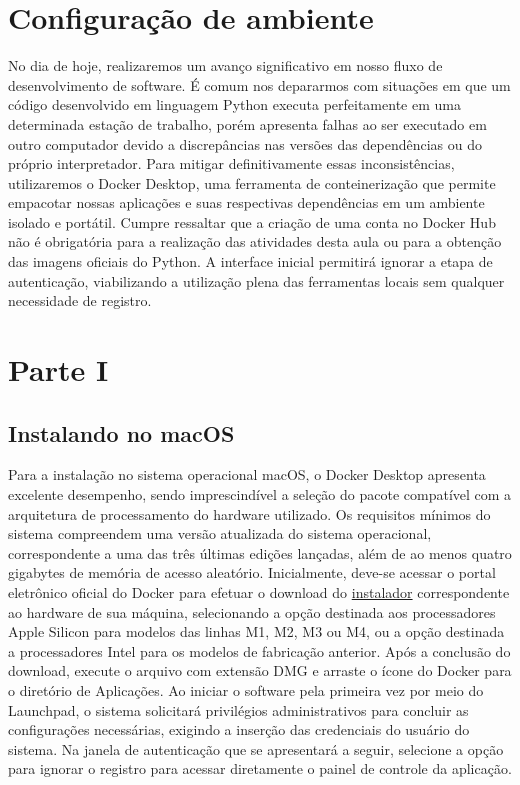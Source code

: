 

\section*{Configuração de ambiente}

No dia de hoje, realizaremos um avanço significativo em nosso fluxo de desenvolvimento de software. É comum nos depararmos com situações em que um código desenvolvido em linguagem Python executa perfeitamente em uma determinada estação de trabalho, porém apresenta falhas ao ser executado em outro computador devido a discrepâncias nas versões das dependências ou do próprio interpretador. Para mitigar definitivamente essas inconsistências, utilizaremos o Docker Desktop, uma ferramenta de conteinerização que permite empacotar nossas aplicações e suas respectivas dependências em um ambiente isolado e portátil.
Cumpre ressaltar que a criação de uma conta no Docker Hub não é obrigatória para a realização das atividades desta aula ou para a obtenção das imagens oficiais do Python. A interface inicial permitirá ignorar a etapa de autenticação, viabilizando a utilização plena das ferramentas locais sem qualquer necessidade de registro.

\section*{Parte I}

\subsection*{Instalando no macOS}

Para a instalação no sistema operacional macOS, o Docker Desktop apresenta excelente desempenho, sendo imprescindível a seleção do pacote compatível com a arquitetura de processamento do hardware utilizado. Os requisitos mínimos do sistema compreendem uma versão atualizada do sistema operacional, correspondente a uma das três últimas edições lançadas, além de ao menos quatro gigabytes de memória de acesso aleatório.
Inicialmente, deve-se acessar o portal eletrônico oficial do Docker para efetuar o download do \href{https://docs.docker.com/desktop/setup/install/mac-install/}{instalador} correspondente ao hardware de sua máquina, selecionando a opção destinada aos processadores Apple Silicon para modelos das linhas M1, M2, M3 ou M4, ou a opção destinada a processadores Intel para os modelos de fabricação anterior. Após a conclusão do download, execute o arquivo com extensão DMG e arraste o ícone do Docker para o diretório de Aplicações. Ao iniciar o software pela primeira vez por meio do Launchpad, o sistema solicitará privilégios administrativos para concluir as configurações necessárias, exigindo a inserção das credenciais do usuário do sistema. Na janela de autenticação que se apresentará a seguir, selecione a opção para ignorar o registro para acessar diretamente o painel de controle da aplicação.


